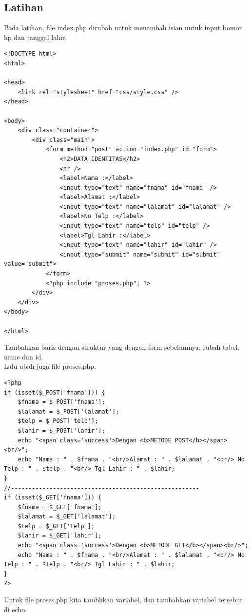 \documentclass[a4paper,12pt]{article}
\begin{document}
\subsection{Latihan}
Pada latihan, file index.php dirubah untuk menambah isian untuk input bomor hp dan tanggal lahir.\\
\begin{lstlisting}[style=PHP]
<!DOCTYPE html>
<html>

<head>
    <link rel="stylesheet" href="css/style.css" />
</head>

<body>
    <div class="container">
        <div class="main">
            <form method="post" action="index.php" id="form">
                <h2>DATA IDENTITAS</h2>
                <hr />
                <label>Nama :</label>
                <input type="text" name="fnama" id="fnama" />
                <label>Alamat :</label>
                <input type="text" name="lalamat" id="lalamat" />
                <label>No Telp :</label>
                <input type="text" name="telp" id="telp" />
                <label>Tgl Lahir :</label>
                <input type="text" name="lahir" id="lahir" />
                <input type="submit" name="submit" id="submit" value="submit">
            </form>
            <?php include "proses.php"; ?>
        </div>
    </div>
</body>

</html>
\end{lstlisting}
Tambahkan baris dengan struktur yang dengan form sebelumnya, rubah tabel, name dan id.\\
Lalu ubah juga file proses.php.
\begin{lstlisting}[style=PHP]
<?php
if (isset($_POST['fnama'])) {
    $fnama = $_POST['fnama'];
    $lalamat = $_POST['lalamat'];
    $telp = $_POST['telp'];
    $lahir = $_POST['lahir'];
    echo "<span class='success'>Dengan <b>METODE POST</b></span><br/>";
    echo "Nama : " . $fnama . "<br/>Alamat : " . $lalamat . "<br/> No Telp : " . $telp . "<br/> Tgl Lahir : " . $lahir;
}
//------------------------------------------------------
if (isset($_GET['fnama'])) {
    $fnama = $_GET['fnama'];
    $lalamat = $_GET['lalamat'];
    $telp = $_GET['telp'];
    $lahir = $_GET['lahir'];
    echo "<span class='success'>Dengan <b>METODE GET</b></span><br/>";
    echo "Nama : " . $fnama . "<br/>Alamat : " . $lalamat . "<br/> No Telp : " . $telp . "<br/> Tgl Lahir : " . $lahir;
}
?>
\end{lstlisting}
Untuk file proses.php kita tambhkan variabel, dan tambahkan variabel tersebut di echo.\\
\end{document}
